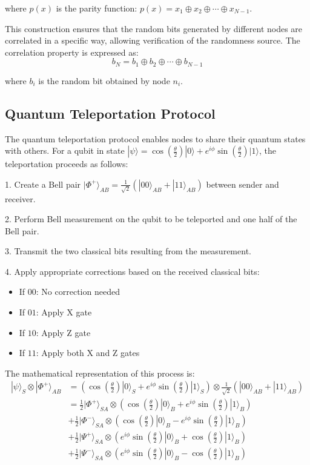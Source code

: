 \documentclass[11pt,a4paper]{article}
\begin{document}
where $p(x)$ is the parity function: $p(x) = x_1 \oplus x_2 \oplus \cdots \oplus x_{N-1}$.

This construction ensures that the random bits generated by different nodes are correlated in a specific way, allowing verification of the randomness source. The correlation property is expressed as:
\begin{equation}
b_N = b_1 \oplus b_2 \oplus \cdots \oplus b_{N-1}
\end{equation}

where $b_i$ is the random bit obtained by node $n_i$.

\subsection{Quantum Teleportation Protocol}
The quantum teleportation protocol enables nodes to share their quantum states with others. For a qubit in state $|\psi\rangle = \cos\left(\frac{\theta}{2}\right)|0\rangle + e^{i\phi}\sin\left(\frac{\theta}{2}\right)|1\rangle$, the teleportation proceeds as follows:

1. Create a Bell pair $|\Phi^+\rangle_{AB} = \frac{1}{\sqrt{2}}(|00\rangle_{AB} + |11\rangle_{AB})$ between sender and receiver.

2. Perform Bell measurement on the qubit to be teleported and one half of the Bell pair.

3. Transmit the two classical bits resulting from the measurement.

4. Apply appropriate corrections based on the received classical bits:
   \begin{itemize}
     \item If $00$: No correction needed
     \item If $01$: Apply X gate
     \item If $10$: Apply Z gate
     \item If $11$: Apply both X and Z gates
   \end{itemize}

The mathematical representation of this process is:
\begin{align}
|\psi\rangle_S \otimes |\Phi^+\rangle_{AB} &= \left(\cos\left(\frac{\theta}{2}\right)|0\rangle_S + e^{i\phi}\sin\left(\frac{\theta}{2}\right)|1\rangle_S\right) \otimes \frac{1}{\sqrt{2}}(|00\rangle_{AB} + |11\rangle_{AB}) \\
&= \frac{1}{2}|\Phi^+\rangle_{SA} \otimes \left(\cos\left(\frac{\theta}{2}\right)|0\rangle_B + e^{i\phi}\sin\left(\frac{\theta}{2}\right)|1\rangle_B\right) \\
&+ \frac{1}{2}|\Phi^-\rangle_{SA} \otimes \left(\cos\left(\frac{\theta}{2}\right)|0\rangle_B - e^{i\phi}\sin\left(\frac{\theta}{2}\right)|1\rangle_B\right) \\
&+ \frac{1}{2}|\Psi^+\rangle_{SA} \otimes \left(e^{i\phi}\sin\left(\frac{\theta}{2}\right)|0\rangle_B + \cos\left(\frac{\theta}{2}\right)|1\rangle_B\right) \\
&+ \frac{1}{2}|\Psi^-\rangle_{SA} \otimes \left(e^{i\phi}\sin\left(\frac{\theta}{2}\right)|0\rangle_B - \cos\left(\frac{\theta}{2}\right)|1\rangle_B\right)
\end{align}
\end{document}
